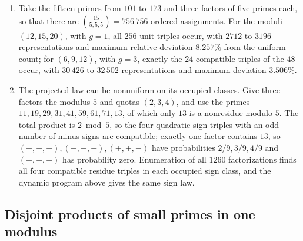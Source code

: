 \begin{example}\label{dir:ex:factorizations}
\begin{enumerate}[label=\textup{(\arabic*)}]
\item Take the fifteen primes from $101$ to $173$ and three factors of five primes each, so that
there are $\binom{15}{5,5,5}=756\,756$ ordered assignments. For the moduli $(12,15,20)$, with
$g=1$, all $256$ unit triples occur, with $2712$ to $3196$ representations and maximum relative
deviation $8.257\%$ from the uniform count; for $(6,9,12)$, with $g=3$, exactly the $24$
compatible triples of the $48$ occur, with $30\,426$ to $32\,502$ representations and maximum
deviation $3.506\%$.
\item The projected law can be nonuniform on its occupied classes. Give three factors the
modulus $5$ and quotas $(2,3,4)$, and use the primes $11,19,29,31,41,59,61,71,13$, of which only
$13$ is a nonresidue modulo $5$. The total product is $2\bmod5$, so the four quadratic-sign
triples with an odd number of minus signs are compatible; exactly one factor contains $13$, so
$(-,+,+),(+,-,+),(+,+,-)$ have probabilities $2/9,3/9,4/9$ and $(-,-,-)$ has probability zero.
Enumeration of all $1260$ factorizations finds all four compatible residue triples in each
occupied sign class, and the dynamic program above gives the same sign law.
\end{enumerate}
\end{example}

\subsection{Disjoint products of small primes in one modulus}\label{dir:sec:disjoint}


